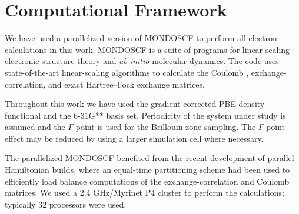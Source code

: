 \commentoutA{\documentclass[prl,aps,twocolumn,twocolumngrid,superbib]{revtex4}}
\begin{document}
\section{Computational Framework}
We have used a parallelized version of MONDOSCF\cite{MondoSCF} to
perform all-electron calculations in this work.  MONDOSCF is a suite
of programs for linear scaling electronic-structure theory and {\it ab
initio} molecular dynamics. The code uses state-of-the-art
linear-scaling algorithms to calculate the
Coulomb\cite{MChallacombe96B,MChallacombe97} ,
exchange-correlation\cite{MChallacombe00A}, and exact Hartree--Fock
exchange\cite{ESchwegler96,ESchwegler97,ESchwegler98A} matrices.

Throughout this work we have used the gradient-corrected PBE density
functional\cite{Perdew_96v77} and the 6-31G** basis set.  Periodicity
of the system under study is assumed and the $\Gamma$ point is used
for the Brillouin zone sampling. The $\Gamma$ point effect may be
reduced by using a larger simulation cell where necessary.

The parallelized MONDOSCF benefited from the recent development of
parallel Hamiltonian builds, where an equal-time partitioning scheme
had been used to efficiently load balance computations of the
exchange-correlation\cite{CGan03} and Coulomb\cite{CGan04B} matrices.
We used a 2.4 GHz/Myrinet P4 cluster to perform the calculations;
typically 32 processors were used.
\end{document}
